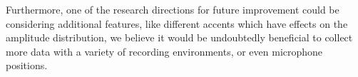 \documentclass[letterpaper,12pt]{article}
\begin{document}
Furthermore, one of the research directions for future improvement could be considering additional features, like different accents which have effects on the amplitude distribution, we believe it would be undoubtedly beneficial to collect more data with a variety of recording environments, or even microphone positions.


\begin{figure}[!h]
    \centering
    \hfill

\end{figure}
\end{document}
